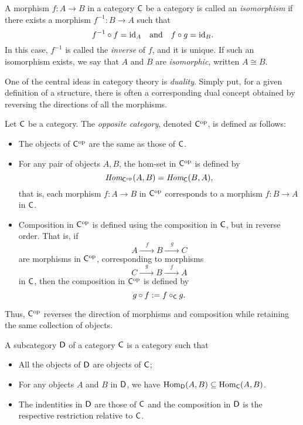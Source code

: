 \begin{definition} 
 A morphism $f : A \to B$  in a category $\mathsf{C}$ be a category is called an \emph{isomorphism} if there exists a morphism $f^{-1} : B \to A$ such that
\[
f^{-1} \circ f = \mathrm{id}_A \quad \text{and} \quad f \circ g = \mathrm{id}_B.
\]
In this case, $f^{-1}$ is called the \emph{inverse} of $f$, and it is unique. If such an isomorphism exists, we say that $A$ and $B$ are \emph{isomorphic}, written
$A \cong B.$
\end{definition}

One of the central ideas in category theory is \emph{duality}. Simply put, for a given definition of a structure, there is often a corresponding dual concept obtained by reversing the directions of all the morphisms. 

\begin{definition} 
Let \(\mathsf{C}\) be a category. The \emph{opposite category}, denoted \(\mathsf{C}^{\mathrm{op}}\), is defined as follows:
\begin{itemize}
  \item The objects of \(\mathsf{C}^{\mathrm{op}}\) are the same as those of \(\mathsf{C}\).
  \item For any pair of objects \(A, B\), the hom-set in \(\mathsf{C}^{\mathrm{op}}\) is defined by
  \[
  \textit{Hom}_{\mathsf{C}^{\mathrm{op}}}(A, B) = \textit{Hom}_{\mathsf{C}}(B, A),
  \]
  that is, each morphism \(f: A \to B\) in \(\mathsf{C}^{\mathrm{op}}\) corresponds to a morphism \(f: B \to A\) in \(\mathsf{C}\).
  \item Composition in \(\mathsf{C}^{\mathrm{op}}\) is defined using the composition in \(\mathsf{C}\), but in reverse order. That is, if
  \[
  A \xrightarrow{ \quad f \quad } B \xrightarrow{\quad g \quad } C
  \]
  are morphisms in \(\mathsf{C}^{\mathrm{op}}\), corresponding to morphisms
  \[
  C \xrightarrow{ \quad g \quad} B \xrightarrow{ \quad f \quad} A
  \]
  in \(\mathsf{C}\), then the composition in \(\mathsf{C}^{\mathrm{op}}\) is defined by
  \[
  g \circ f := f \circ_{\mathsf{C}} g.
  \]
\end{itemize}

Thus, \(\mathsf{C}^{\mathrm{op}}\) reverses the direction of morphisms and composition while retaining the same collection of objects.
\end{definition}

\begin{definition}
  A subcategory \( \mathsf{D} \) of a category \( \mathsf{C} \) is a category such that 
  \begin{itemize}
    \item All the objects of \( \mathsf{D} \) are objects of \( \mathsf{C} \);
    \item  For any objects \( A \) and \( B \) in \( \mathsf{D} \), we have \( \mathrm{Hom}_{\mathsf{D}}(A, B) \subseteq \mathrm{Hom}_{\mathsf{C}}(A, B) \).
    \item The indentities in $\mathsf{D}$ are those of $\mathsf{C}$ and the composition in $\mathsf{D}$ is the respective restriction relative to $\mathsf{C}$.
  \end{itemize}
  
\end{definition}

